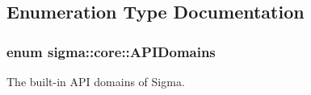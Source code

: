 \subsection{Enumeration Type Documentation}
\hypertarget{namespacesigma_1_1core_a48ec553a4adec5e4ca04a94946e39227}{
\subsubsection[{A\-P\-I\-Domains}]{\setlength{\rightskip}{0pt plus 5cm}enum {\bf sigma\-::core\-::\-A\-P\-I\-Domains}}}\label{namespacesigma_1_1core_a48ec553a4adec5e4ca04a94946e39227}


The built-\/in A\-P\-I domains of Sigma. 

